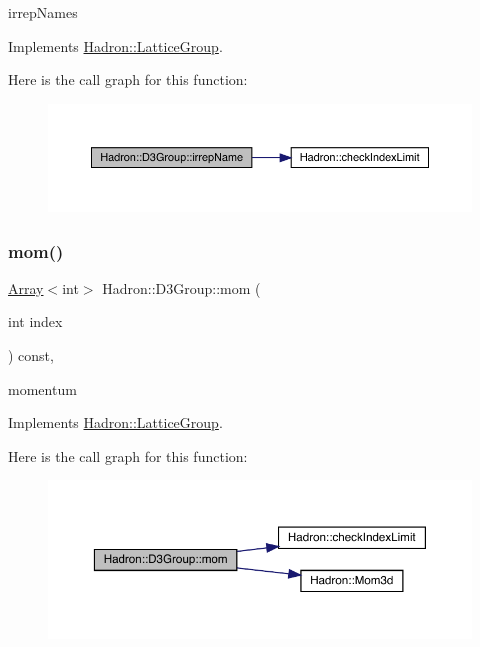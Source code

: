 irrep\+Names 

Implements \mbox{\hyperlink{structHadron_1_1LatticeGroup_a4bc5620218c2a73157e19bc4451fe746}{Hadron\+::\+Lattice\+Group}}.

Here is the call graph for this function\+:
\nopagebreak
\begin{figure}[H]
\begin{center}
\leavevmode
\includegraphics[width=350pt]{de/de1/structHadron_1_1D3Group_a3e60ca3001ddc0176179107cfed2d621_cgraph}
\end{center}
\end{figure}
\mbox{\label{structHadron_1_1D3Group_a5662028a7fb3554c893609148e6d3eeb}} 
\subsubsection{\texorpdfstring{mom()}{mom()}\hspace{0.1cm}{\footnotesize\ttfamily [1/2]}}
{\footnotesize\ttfamily \mbox{\hyperlink{classXMLArray_1_1Array}{Array}}$<$int$>$ Hadron\+::\+D3\+Group\+::mom (\begin{DoxyParamCaption}\item[{int}]{index }\end{DoxyParamCaption}) const\hspace{0.3cm}{\ttfamily [inline]}, {\ttfamily [virtual]}}

momentum 

Implements \mbox{\hyperlink{structHadron_1_1LatticeGroup_ad577b65041dd9a6e84b1f3bd49cb8fce}{Hadron\+::\+Lattice\+Group}}.

Here is the call graph for this function\+:
\nopagebreak
\begin{figure}[H]
\begin{center}
\leavevmode
\includegraphics[width=350pt]{de/de1/structHadron_1_1D3Group_a5662028a7fb3554c893609148e6d3eeb_cgraph}
\end{center}
\end{figure}
\mbox{\label{structHadron_1_1D3Group_a5662028a7fb3554c893609148e6d3eeb}} 
